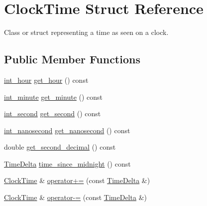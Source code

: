 \hypertarget{structClockTime}{\section{\-Clock\-Time \-Struct \-Reference}
\label{structClockTime}
}


\-Class or struct representing a time as seen on a clock.  


\subsection*{\-Public \-Member \-Functions}
\begin{DoxyCompactItemize}
\item 
\hyperlink{types_8h_afc81a27a9c08f0790f17b34bdf95cdb7}{int\-\_\-hour} \hyperlink{structClockTime_ab188f450c2b8519296c96529afc8d92f}{get\-\_\-hour} () const 
\item 
\hyperlink{types_8h_ae648329a919e6d860ef5ef2aac4ffb86}{int\-\_\-minute} \hyperlink{structClockTime_ae882482085d1cc290b055381f407cb6a}{get\-\_\-minute} () const 
\item 
\hyperlink{types_8h_acdee90940aea1c6f3e71652fb525a987}{int\-\_\-second} \hyperlink{structClockTime_a054e575b6ba259efdf3d79ebdf7fc501}{get\-\_\-second} () const 
\item 
\hyperlink{types_8h_a2a3f766e7346eb6ae01022cd28128ea6}{int\-\_\-nanosecond} \hyperlink{structClockTime_a4ddf3b506ad8f3576df034fbf3febae4}{get\-\_\-nanosecond} () const 
\item 
double \hyperlink{structClockTime_a174f09985d45efc748ca956c9ca2fb2e}{get\-\_\-second\-\_\-decimal} () const 
\item 
\hyperlink{structTimeDelta}{\-Time\-Delta} \hyperlink{structClockTime_a9c6423703cb0026435fb6e5b2d261d54}{time\-\_\-since\-\_\-midnight} () const 
\item 
\hyperlink{structClockTime}{\-Clock\-Time} \& \hyperlink{structClockTime_aec48dca559fd8b1f97c624eb45205d51}{operator+=} (const \hyperlink{structTimeDelta}{\-Time\-Delta} \&)
\item 
\hyperlink{structClockTime}{\-Clock\-Time} \& \hyperlink{structClockTime_ac5197cbbfba2f45bfeb9f24175c60b14}{operator-\/=} (const \hyperlink{structTimeDelta}{\-Time\-Delta} \&)
\end{DoxyCompactItemize}
